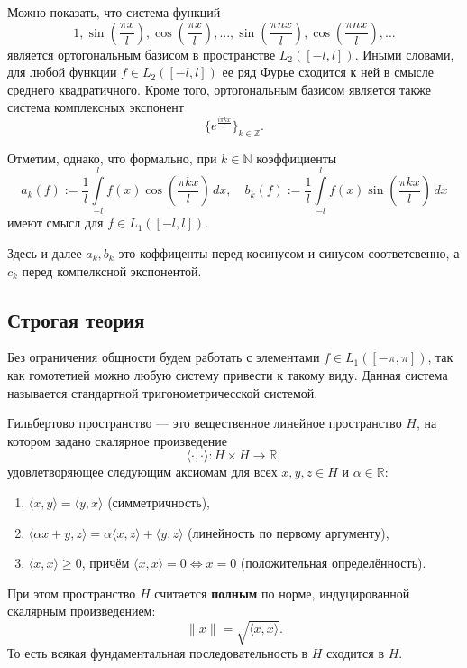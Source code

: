 Можно показать, что система функций
\begin{equation}
\label{eqq.trigonometric_system}
1,\sin(\frac{\pi x}{l}), \cos(\frac{\pi x}{l}), ... ,\sin(\frac{\pi n x}{l}),\cos(\frac{\pi n x}{l}),...
\end{equation}
является ортогональным базисом в пространстве $L_{2}([-l,l])$. Иными словами, для любой функции $f \in L_{2}([-l,l])$ ее ряд Фурье сходится к ней в смысле среднего квадратичного.
Кроме того, ортогональным базисом является также система комплексных экспонент
\begin{equation}
\label{eqq.trigonometric_system_2}
\{e^{\frac{i\pi kx}{l}}\}_{k \in \mathbb{Z}}.
\end{equation}



Отметим, однако, что формально, при $k \in \mathbb{N}$ коэффициенты
$$
a_{k}(f):=\frac{1}{l}\int\limits_{-l}^{l}f(x)\cos(\frac{\pi k x}{l})\,dx, \quad b_{k}(f):=\frac{1}{l}\int\limits_{-l}^{l}f(x)\sin(\frac{\pi k x}{l})\,dx
$$
имеют смысл для $f \in L_{1}([-l,l])$.

\begin{note}
    Здесь и далее $a_k, b_k$ это коффиценты перед косинусом и синусом соответсвенно, а $c_k$ перед компелксной экспонентой.
\end{note}

\subsection{Строгая теория}
Без ограничения общности будем работать с элементами $f \in L_{1}([-\pi,\pi])$, так как гомотетией можно любую систему привести к такому виду. Данная система называется стандартной тригонометричесской системой.

\begin{definition}
    Гильбертово пространство — это вещественное линейное пространство \( H \), на котором задано скалярное произведение
\[
\langle \cdot, \cdot \rangle : H \times H \to \mathbb{R},
\]
удовлетворяющее следующим аксиомам для всех \( x, y, z \in H \) и \( \alpha \in \mathbb{R} \):
\begin{enumerate}
    \item \( \langle x, y \rangle = \langle y, x \rangle \) (симметричность),
    \item \( \langle \alpha x + y, z \rangle = \alpha \langle x, z \rangle + \langle y, z \rangle \) (линейность по первому аргументу),
    \item \( \langle x, x \rangle \geq 0 \), причём \( \langle x, x \rangle = 0 \iff x = 0 \) (положительная определённость).
\end{enumerate}
При этом пространство \( H \) считается \textbf{полным} по норме, индуцированной скалярным произведением:
\[
\|x\| = \sqrt{\langle x, x \rangle}.
\]
То есть всякая фундаментальная последовательность в \( H \) сходится в \( H \).
\end{definition}

